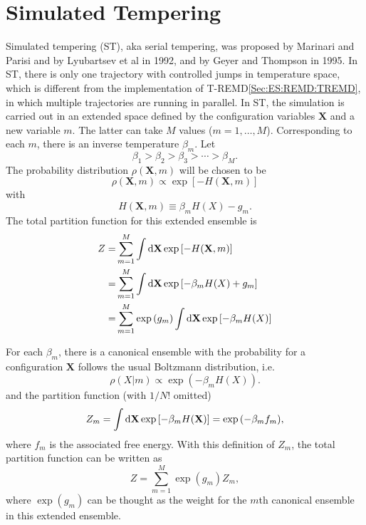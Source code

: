 \section{Simulated Tempering\label{Sec:ES:ST}}
Simulated tempering (ST), aka serial tempering, was proposed by Marinari and Parisi\cite{MarinariEPL1992} and by Lyubartsev et al\cite{LyubartsevJCP1992} in 1992, and by Geyer and Thompson\cite{GeyerJASA1995} in 1995. In ST, there is only one trajectory with controlled jumps in temperature space, which is different from the implementation of T-REMD\ref{Sec:ES:REMD:TREMD}, in which multiple trajectories are running in parallel. In ST, the simulation is carried out in an extended space defined by the configuration variables $\mathbf{X}$ and a new variable $m$. The latter can take $M$ values ($m=1,\dots,M$). Corresponding to each $m$, there is an inverse temperature $\beta_m$. Let
\begin{equation}
    \beta_1>\beta_2>\beta_3>\cdots >\beta_M.
\end{equation}
The probability distribution $\rho(\mathbf{X},m)$ will be chosen to be 
\begin{equation}
  \rho(\mathbf{X},m)\propto \exp{\left[-H(\mathbf{X},m)\right]}
\end{equation}
with 
\begin{equation}
  H(\mathbf{X},m)\equiv \beta_m H(X)-g_m.
\end{equation}
The total partition function for this extended ensemble is
\begin{align}
    Z=&\sum_{m=1}^M \int\mathop{}\!\mathrm{d} \mathbf{X} \exp{\left[-H(\mathbf{X},m)\right]}\notag\\
     =&\sum_{m=1}^M \int\mathop{}\!\mathrm{d} \mathbf{X} \exp{\left[-\beta_m H(X)+g_m\right]}\notag\\
     =&\sum_{m=1}^M \exp{(g_m)}\int\mathop{}\!\mathrm{d} \mathbf{X} \exp{\left[-\beta_m H(X)\right]}
\end{align}

For each $\beta_m$, there is a canonical ensemble with the probability for a configuration $\mathbf{X}$ follows the usual Boltzmann distribution, i.e. 
\begin{equation}
    \rho(X|m)\propto \exp{(-\beta_m H(X))}.
\end{equation}
and the partition function (with $1/N!$ omitted)
\begin{equation}
    Z_m=\int \mathop{}\!\mathrm{d} \mathbf{X} \exp{[-\beta_m H(\mathbf{X})]}=\exp{(-\beta_m f_m)},
\end{equation}
where $f_m$ is the associated free energy. With this definition of $Z_m$, the total partition function can be written as
\begin{equation}
    Z=\sum_{m=1}^M \exp{(g_m)} Z_m,
\end{equation}
where $\exp{(g_m)}$ can be thought as the weight for the $m$th canonical ensemble in this extended ensemble.

